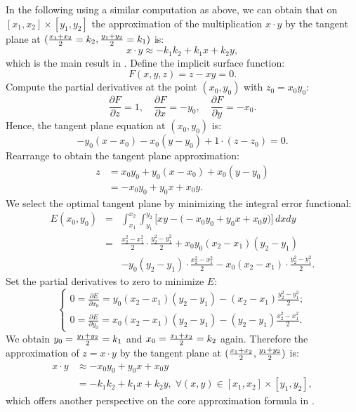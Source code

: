 \documentclass[conference]{IEEEtran}
\begin{document}
In the following using a similar computation as above, we can obtain that on $[x_{1}, x_{2}]\times [y_{1}, y_{2}]$ the approximation of the multiplication $x\cdot y$ by the tangent plane at $({x_{1}+x_{2}\over 2}=k_{2}, {y_{1}+y_{2}\over 2}=k_{1})$ is:
$$x\cdot y\approx-k_{1}k_{2}+k_{1}x+k_{2}y,$$
which is the main result in \cite{CTChen}. 
Define the implicit surface function:
\[
F(x,y,z)=z-xy=0.
\]
Compute the partial derivatives at the point $(x_0,y_0)$ with $z_0=x_0y_0$:
\[
\frac{\partial F}{\partial z}=1,\quad \frac{\partial F}{\partial x}=-y_0,\quad \frac{\partial F}{\partial y}=-x_0.
\]
Hence, the tangent plane equation at $(x_0,y_0)$ is:
\[
-y_0(x-x_0)-x_0(y-y_0)+1\cdot(z-z_0)=0.
\]
Rearrange to obtain the tangent plane approximation:
\[
\begin{aligned}
z &= x_0y_0 + y_0(x-x_0) + x_0(y-y_0) \\
&= -x_0y_0 + y_0 x + x_0 y.
\end{aligned}
\]
We select the optimal tangent plane by minimizing the integral error functional:
$$
\begin{array}{rcl}
E(x_0,y_0)&=&\int_{x_1}^{x_2}\int_{y_1}^{y_2}\big[xy-\big(-x_0y_0+y_0x+x_0y\big)\big]\,dxdy\\
&=&\frac{x_2^2-x_1^2}{2}\cdot\frac{y_2^2-y_1^2}{2}
+x_0y_0(x_2-x_1)(y_2-y_1)\\
&&-y_0(y_2-y_1)\cdot\frac{x_2^2-x_1^2}{2} -x_0(x_2-x_1)\cdot\frac{y_2^2-y_1^2}{2}.
\end{array}$$
Set the partial derivatives to zero to minimize $E$:
$$\left\{
\begin{array}{l}
0=\frac{\partial E}{\partial x_0}
=y_0(x_2-x_1)(y_2-y_1)-(x_2-x_1)\frac{y_2^2-y_1^2}{2};\\
0=\frac{\partial E}{\partial y_0}
=x_0(x_2-x_1)(y_2-y_1)-(y_2-y_1)\frac{x_2^2-x_1^2}{2}.
\end{array}\right.$$
We obtain $y_{0}={y_{1}+y_{2}\over 2}=k_{1}$ and $x_{0}={x_{1}+x_{2}\over 2}=k_{2}$ again.
Therefore the approximation of $z=x\cdot y$ by the tangent plane at $({x_{1}+x_{2}\over 2}, {y_{1}+y_{2}\over 2})$ is:
$$
\begin{aligned}
x\cdot y &\approx -x_0y_0 + y_0 x + x_0 y \\
&=-k_{1}k_{2}+k_{1}x+k_{2}y, \;\forall (x,y)\in [x_{1}, x_{2}]\times [y_{1}, y_{2}],
\end{aligned}
$$
 which  offers another perspective on the core approximation formula in  \cite{CTChen}.
\end{document}
